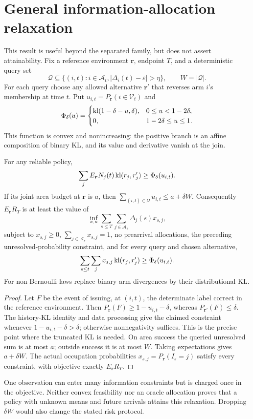 \section{General information-allocation relaxation}
\label{app:information}

This result is useful beyond the separated family, but does not assert
attainability. Fix a reference environment $\boldsymbol r$, endpoint $T$, and a
deterministic query set
\[
 \mathcal Q\subseteq\{(i,t):i\in \mathcal{A}_t,
                  |\Delta_i(t)-\varepsilon|>\eta\},\qquad W=|\mathcal Q|.
\]
For each query choose any allowed alternative $\boldsymbol r'$ that reverses arm
$i$'s membership at time $t$. Put $u_{i,t}=P_{\boldsymbol r}(i\in \mathcal V_t)$ and
\[
 \Phi_\delta(u)=
 \begin{cases}
 \operatorname{kl}(1-\delta-u,\delta),&0\le u<1-2\delta,\\
 0,&1-2\delta\le u\le1.
 \end{cases}
\]
This function is convex and nonincreasing: the positive branch is an affine
composition of binary KL, and its value and derivative vanish at the join.

\begin{proposition}
\label{prop:information}
For any reliable policy,
\[
 \sum_jE_{\boldsymbol r} N_j(t)\operatorname{kl}(r_j,r_j')
                       \ge\Phi_\delta(u_{i,t}).
\]
If its joint area budget at $\boldsymbol r$ is $a$, then
$\sum_{(i,t)\in\mathcal Q}u_{i,t}\le a+\delta W$. Consequently $E_{\boldsymbol r} R_T$
is at least the value of
\[
 \inf_{x,u}\sum_{s\le T}\sum_{j\in \mathcal{A}_s}\Delta_j(s)x_{s,j},
\]
subject to $x_{s,j}\ge0$, $\sum_{j\in \mathcal{A}_s}x_{s,j}=1$, no prearrival
allocations, the preceding unresolved-probability constraint, and for every
query and chosen alternative,
\[
 \sum_{s\le t}\sum_jx_{s,j}\operatorname{kl}(r_j,r_j')
                             \ge\Phi_\delta(u_{i,t}).
\]
For non-Bernoulli laws replace binary arm divergences by their distributional KL.
\end{proposition}
\begin{proof}
Let $F$ be the event of issuing, at $(i,t)$, the determinate label correct in
the reference environment. Then $P_{\boldsymbol r}(F)\ge1-u_{i,t}-\delta$, whereas
$P_{\boldsymbol r'}(F)\le\delta$. The history-KL identity and data processing give
the claimed constraint whenever $1-u_{i,t}-\delta>\delta$; otherwise
nonnegativity suffices. This is the precise point where the truncated KL is
needed. On area success the queried unresolved sum is at most $a$; outside
success it is at most $W$. Taking expectations gives $a+\delta W$.
The actual occupation probabilities $x_{s,j}=P_{\boldsymbol r}(I_s=j)$ satisfy every
constraint, with objective exactly $E_{\boldsymbol r} R_T$.
\end{proof}

One observation can enter many information constraints but is charged once
in the objective. Neither convex feasibility nor an oracle allocation proves
that a policy with unknown means and future arrivals attains this relaxation.
Dropping $\delta W$ would also change the stated risk protocol.
